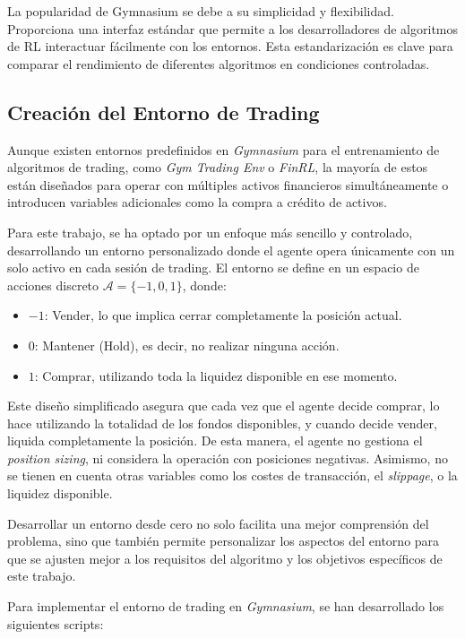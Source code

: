\documentclass[a4paper,12pt, twoside]{report}
\begin{document}
La popularidad de Gymnasium se debe a su simplicidad y flexibilidad. Proporciona una 
interfaz estándar que permite a los desarrolladores de algoritmos de RL interactuar 
fácilmente con los entornos. Esta estandarización es clave para comparar el rendimiento 
de diferentes algoritmos en condiciones controladas.

\subsection{Creación del Entorno de Trading}

Aunque existen entornos predefinidos en \textit{Gymnasium} para el entrenamiento de 
algoritmos de trading, como \textit{Gym Trading Env} o \textit{FinRL}, la mayoría 
de estos están diseñados para operar con múltiples activos financieros simultáneamente 
o introducen variables adicionales como la compra a crédito de activos. 

Para este trabajo, se ha optado por un enfoque más sencillo y controlado, desarrollando 
un entorno personalizado donde el agente opera únicamente con un solo activo en cada 
sesión de trading. El entorno se define en un espacio de acciones discreto 
$\mathcal{A} = \{-1, 0, 1\}$, donde:

\begin{itemize}
    \item $-1$: Vender, lo que implica cerrar completamente la posición actual.
    \item $0$: Mantener (Hold), es decir, no realizar ninguna acción.
    \item $1$: Comprar, utilizando toda la liquidez disponible en ese momento.
\end{itemize}

Este diseño simplificado asegura que cada vez que el agente decide comprar, 
lo hace utilizando la totalidad de los fondos disponibles, y cuando decide vender, 
liquida completamente la posición. De esta manera, el agente no gestiona el 
\textit{position sizing}, ni considera la operación con posiciones negativas. 
Asimismo, no se tienen en cuenta otras variables como los costes de transacción, 
el \textit{slippage}, o la liquidez disponible.

Desarrollar un entorno desde cero no solo facilita una mejor comprensión del problema, 
sino que también permite personalizar los aspectos del entorno para que se ajusten mejor 
a los requisitos del algoritmo y los objetivos específicos de este trabajo.

Para implementar el entorno de trading en \textit{Gymnasium}, se han desarrollado 
los siguientes scripts:
\end{document}
